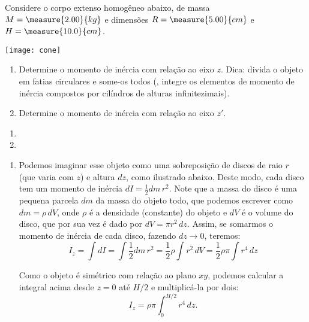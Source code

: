 \begin{question}
    Considere o corpo extenso homogêneo abaixo, de massa $M = \measure{2.00}{kg}$ e dimensões $R = \measure{5.00}{cm}$ e $H = \measure{10.0}{cm}$.
    
    \begin{center}
      \texttt{[image: cone]}
    \end{center}
    
    \begin{enumerate}
      \item Determine o momento de inércia com relação ao eixo $z$.
      Dica: divida o objeto em fatias circulares e some-os todos (\ie, integre os elementos de momento de inércia compostos por cilíndros de alturas infinitezimais).
      \item Determine o momento de inércia com relação ao eixo $z'$.
    \end{enumerate}

    \begin{answer}
      \begin{enumerate}
        \item {}
        \item {}
      \end{enumerate}
    \end{answer}

    \begin{solution}
      \begin{enumerate}
        \item Podemos imaginar esse objeto como uma sobreposição de discos de raio $r$ (que varia com $z$) e altura $dz$, como ilustrado abaixo.
        Deste modo, cada disco tem um momento de inércia $dI = \frac{1}{2}dm\, r^2$.
        Note que a massa do disco é uma pequena parcela $dm$ da massa do objeto todo, que podemos escrever como $dm = \rho\, dV$, onde $\rho$ é a densidade (constante) do objeto e $dV$ é o volume do disco, que por sua vez é dado por $dV = \pi r^2\, dz$.
        Assim, se somarmos o momento de inércia de cada disco, fazendo $dz \to 0$, teremos:
        \begin{equation*}
        I_z = \int dI = \int\frac{1}{2}dm\, r^2 = \frac{1}{2}\rho \int r^2\, dV = \frac{1}{2}\rho\pi \int r^4\, dz
        \end{equation*}
        
        
        Como o objeto é simétrico com relação ao plano $xy$, podemos calcular a integral acima desde $z = 0$ até $H/2$ e multiplicá-la por dois:
        \begin{equation*}
        I_z = \rho\pi \int_{0}^{H/2} r^4\, dz.
        \end{equation*}
        

\end{enumerate}
\end{solution}
\end{question}
